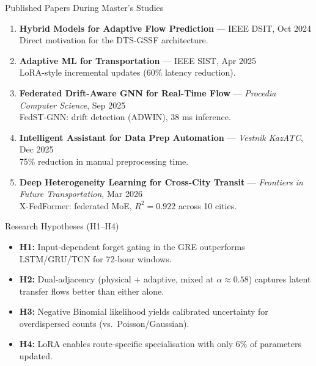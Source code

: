 \documentclass[aspectratio=169, 11pt]{beamer}
\begin{document}
\begin{frame}{Published Papers During Master's Studies}
\small
\vspace{0.3em}
\begin{enumerate}
  \item \textbf{Hybrid Models for Adaptive Flow Prediction} --- IEEE DSIT, Oct 2024\cite{begisbayev2024investigation}\\
  {\footnotesize Direct motivation for the DTS-GSSF architecture.}
  \vspace{0.4em}
  \item \textbf{Adaptive ML for Transportation} --- IEEE SIST, Apr 2025\cite{mektepbayeva2025adaptive}\\
  {\footnotesize LoRA-style incremental updates (60\% latency reduction).}
  \vspace{0.4em}
  \item \textbf{Federated Drift-Aware GNN for Real-Time Flow} --- \textit{Procedia Computer Science}, Sep 2025\cite{sakhipov2025federated}\\
  {\footnotesize FedST-GNN: drift detection (ADWIN), 38 ms inference.}
  \vspace{0.4em}
  \item \textbf{Intelligent Assistant for Data Prep Automation} --- \textit{Vestnik KazATC}, Dec 2025\cite{yedilkhan2025intelligent}\\
  {\footnotesize 75\% reduction in manual preprocessing time.}
  \vspace{0.4em}
  \item \textbf{Deep Heterogeneity Learning for Cross-City Transit} --- \textit{Frontiers in Future Transportation}, Mar 2026\cite{sakhipov2026deep}\\
  {\footnotesize X-FedFormer: federated MoE, $R^2=0.922$ across 10 cities.}
\end{enumerate}
\end{frame}

\begin{frame}{Research Hypotheses (H1--H4)}
\vspace{0.3em}
\begin{itemize}
  \item \textbf{H1:} Input-dependent forget gating in the GRE outperforms LSTM/GRU/TCN for 72-hour windows.
  \vspace{0.5em}
  \item \textbf{H2:} Dual-adjacency (physical + adaptive, mixed at $\alpha \approx 0.58$) captures latent transfer flows better than either alone.
  \vspace{0.5em}
  \item \textbf{H3:} Negative Binomial likelihood yields calibrated uncertainty for overdispersed counts (vs.\ Poisson/Gaussian).
  \vspace{0.5em}
  \item \textbf{H4:} LoRA enables route-specific specialisation with only 6\% of parameters updated.
\end{itemize}
\end{frame}
\end{document}
